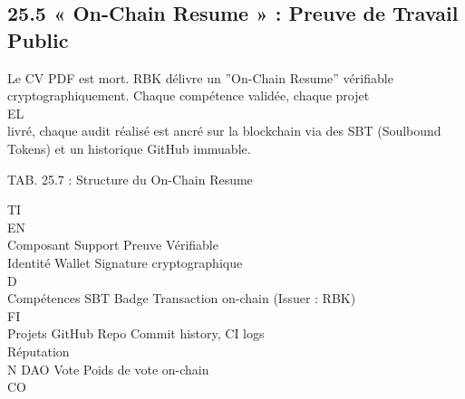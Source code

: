 \subsection{25.5 « On-Chain Resume » : Preuve de Travail Public}
Le CV PDF est mort. RBK délivre un ”On-Chain Resume” vérifiable cryptographiquement. Chaque compétence validée, chaque projet\\
\vspace{0.5em}
\vspace{0.5em}
\vspace{0.5em}
\vspace{0.5em}
EL\\
livré, chaque audit réalisé est ancré sur la blockchain via des SBT (Soulbound Tokens) et un historique GitHub immuable.\\
\vspace{0.5em}
\begin{center}\begin{tabular}TAB. 25.7 : Structure du On-Chain Resume\end{tabular}\end{center}
\vspace{0.5em}
\vspace{0.5em}
\vspace{0.5em}
\vspace{0.5em}
TI\\
EN\\
Composant Support       Preuve Vérifiable\\
Identité    Wallet      Signature cryptographique\\
\vspace{0.5em}
\vspace{0.5em}
\vspace{0.5em}
\vspace{0.5em}
D\\
Compétences SBT Badge   Transaction on-chain (Issuer : RBK)\\
\vspace{0.5em}
\vspace{0.5em}
\vspace{0.5em}
\vspace{0.5em}
FI\\
Projets     GitHub Repo Commit history, CI logs\\
Réputation\\
N DAO Vote    Poids de vote on-chain\\
CO\\
\vspace{0.5em}
